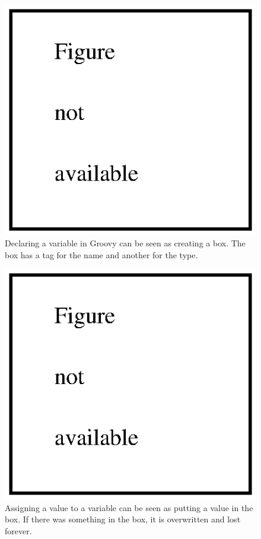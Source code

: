 \begin{figure}
  \centering
  \includegraphics{gfx/no_figure}
  \caption{Declaring a variable in Groovy can be seen as creating a
    box. The box has a tag for the name and another for the type.}
  \label{fig:var1}
\end{figure}

\begin{figure}
  \centering
  \includegraphics{gfx/no_figure}
  \caption{Assigning a value to a variable can be seen as putting a
    value in the box. If there was something in the box, it is
    overwritten and lost forever.}
  \label{fig:var2}
\end{figure}

